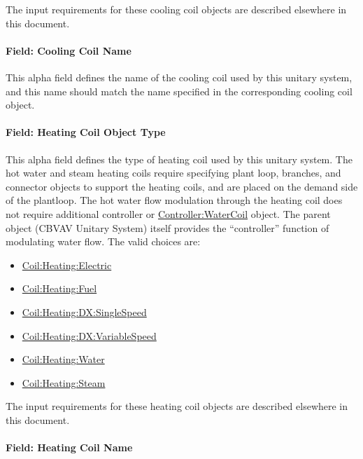 The input requirements for these cooling coil objects are described elsewhere in this document.

\paragraph{Field: Cooling Coil Name}\label{field-cooling-coil-name-6}

This alpha field defines the name of the cooling coil used by this unitary system, and this name should match the name specified in the corresponding cooling coil object.

\paragraph{Field: Heating Coil Object Type}\label{field-heating-coil-object-type-8}

This alpha field defines the type of heating coil used by this unitary system. The hot water and steam heating coils require specifying plant loop, branches, and connector objects to support the heating coils, and are placed on the demand side of the plantloop. The hot water flow modulation through the heating coil does not require additional controller or \hyperref[controllerwatercoil]{Controller:WaterCoil} object. The parent object (CBVAV Unitary System) itself provides the ``controller'' function of modulating water flow. The valid choices are:

\begin{itemize}
\item
  \hyperref[coilheatingelectric]{Coil:Heating:Electric}
\item
  \hyperref[coilheatinggas-000]{Coil:Heating:Fuel}
\item
  \hyperref[coilheatingdxsinglespeed]{Coil:Heating:DX:SingleSpeed}
\item
  \hyperref[coilheatingdxvariablespeed]{Coil:Heating:DX:VariableSpeed}
\item
  \hyperref[coilheatingwater]{Coil:Heating:Water}
\item
  \hyperref[coilheatingsteam]{Coil:Heating:Steam}
\end{itemize}

The input requirements for these heating coil objects are described elsewhere in this document.

\paragraph{Field: Heating Coil Name}\label{field-heating-coil-name-8}

